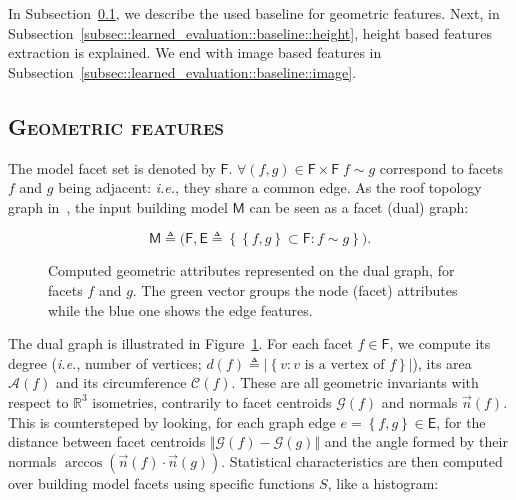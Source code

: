     In Subsection~\ref{subsec::learned_evaluation::baseline::geometric}, we describe the used baseline for geometric features.
    Next, in Subsection~\ref{subsec::learned_evaluation::baseline::height}, height based features extraction is explained.
    We end with image based features in Subsection~\ref{subsec::learned_evaluation::baseline::image}.

    \subsection{\textsc{Geometric features}}
        \label{subsec::learned_evaluation::baseline::geometric}
        The model facet set is denoted by $\mathsf{F}$.
        $\forall (f, g) \in \mathsf{F} \times \mathsf{F} \; f \sim g$ correspond to facets $f$ and $g$ being adjacent: 
        \textit{i.e.}, they share a common edge. As the roof topology graph in~\parencite{verma20063d}, the input building model $\mathsf{M}$ can be seen as a facet (dual) graph:

        \begin{equation}
        	\label{eq::model_graph}
        	\mathsf{M} \triangleq \Big(\mathsf{F}, \mathsf{E} \triangleq \left\{ \left\{f, g\right\} \subset \mathsf{F} : f \sim g \right\} \Big).
        \end{equation}

        \begin{figure}[htbp]
            \centering
            
            \caption{
                \label{fig::geometric_features}
                Computed geometric attributes represented on the dual graph, for facets $f$ and $g$.
                The green vector groups the node (facet) attributes while the blue one shows the edge features.
            }
        \end{figure}

        The dual graph is illustrated in Figure~\ref{fig::geometric_features}.
        For each facet $f \in \mathsf{F}$, we compute its degree (\textit{i.e.}, number of vertices; $d(f) \triangleq \vert\left\{v : v\text{ is a vertex of }f\right\}\vert$), its area $\mathscr{A}(f)$ and its circumference $\mathscr{C}(f)$.
        These are all geometric invariants with respect to $\mathbb{R}^3$ isometries, contrarily to facet centroids $\mathscr{G}(f)$ and normals $\vec{n}(f)$.
        This is countersteped by looking, for each graph edge $e=\left\{f, g\right\} \in \mathsf{E}$, for the distance between facet centroids $\Vert \mathscr{G}(f) - \mathscr{G}(g) \Vert$ and the angle formed by their normals $\arccos(\vec{n}(f) \cdot \vec{n}(g))$.
        Statistical characteristics are then computed over building model facets using specific functions $S$, like a histogram:        

